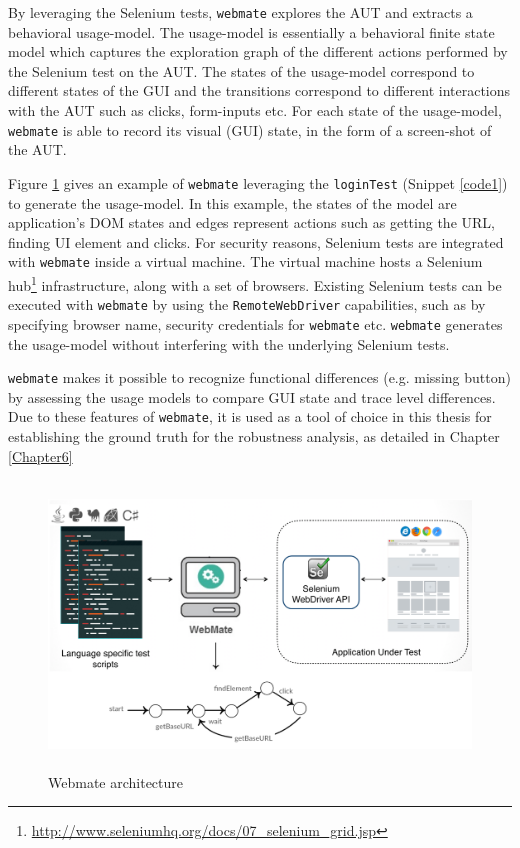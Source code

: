 By leveraging the Selenium tests, \texttt{webmate} explores the AUT and extracts a behavioral usage-model. The usage-model is essentially a behavioral finite state model which captures the exploration graph of the different actions performed by the Selenium test on the AUT. The states of the usage-model correspond to different states of the GUI and the transitions correspond to different interactions with the AUT such as clicks, form-inputs etc. For each state of the usage-model, \texttt{webmate} is able to record its visual (GUI) state, in the form of a screen-shot of the AUT.

Figure \ref{fig:webmateArchitecture} gives an example of \texttt{webmate} leveraging the \texttt{loginTest} (Snippet \ref{code1}) to generate the usage-model. In this example, the states of the model are application's DOM states and edges represent actions such as getting the URL, finding UI element and clicks. For security reasons, Selenium tests are integrated with \texttt{webmate} inside a virtual machine. The virtual machine hosts a Selenium hub\footnote{\url{http://www.seleniumhq.org/docs/07_selenium_grid.jsp}} infrastructure, along with a set of browsers. Existing Selenium tests can be executed with \texttt{webmate} by using the \texttt{RemoteWebDriver} capabilities, such as by specifying browser name, security credentials for \texttt{webmate} etc. \texttt{webmate} generates the usage-model without interfering with the underlying Selenium tests.

 \texttt{webmate} makes it possible to recognize functional differences (e.g. missing button) by assessing the usage models to compare GUI state and trace level differences. Due to these features of \texttt{webmate}, it is used as a tool of choice in this thesis for establishing the ground truth for the robustness analysis, as detailed in Chapter \ref{Chapter6}

\begin{figure}
\makeatletter 
\makeatother
    \centering
  \includegraphics[width=5.5in,height=3in]{./Figures/webmate-state-graph}
  \caption{Webmate architecture}
  \label{fig:webmateArchitecture} 
\end{figure}

